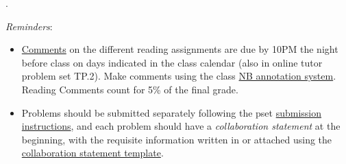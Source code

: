 \documentclass[handout]{mcs}
\begin{document}
\renewcommand{\reading}{
	Chapter~\bref{data_chap}{. on \emph{Sets, Relations, Bijections, and Finite Cardinality}} and  Chapter~\bref{induction_chap}{.on \emph{Induction}}}.


  \emph{Reminders}:
\begin{itemize}

\item 

  \href{http://courses.csail.mit.edu/6.042/spring13/courseinfo#comments}{Comments}
  on the different reading assignments are due by 10PM the night
  before class on days indicated in the class calendar (also in online
  tutor problem set TP.2).  Make comments using the class
  \href{http://nb.csail.mit.edu}{NB annotation system}.  Reading
  Comments count for 5\% of the final grade.

\item Problems should be submitted separately following the pset
  \href{http://courses.csail.mit.edu/6.042/spring13/submission}{submission
    instructions}, and each problem should have a \emph{collaboration
    statement} at the beginning, with the requisite information
  written in or attached using the
  \href{http://courses.csail.mit.edu/6.042/spring13/submission_template.pdf}{collaboration
    statement template}.

 \end{itemize}






\iffalse
\begin{center}
\large \textbf{Optional:}
\end{center}

\pinput{PS_faster_adder_logic}
\fi

\end{document}
